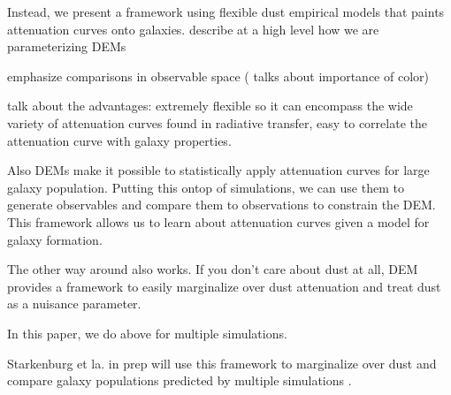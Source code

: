 Instead, we present a framework using flexible dust empirical models that
paints attenuation curves onto galaxies. describe at a high level how we are
parameterizing DEMs 

emphasize comparisons in observable space (\cite{nelson2018} talks about
importance of color)

talk about the advantages: extremely flexible so it can encompass the wide variety of
attenuation curves found in radiative transfer, easy to correlate the
attenuation curve with galaxy properties. 

Also DEMs make it possible to statistically apply attenuation curves for large
galaxy population. Putting this ontop of simulations, we can use them to
generate observables and compare them to observations to constrain the DEM. 
This framework allows us to learn about attenuation curves given a model for 
galaxy formation. 

The other way around also works. If you don't care about dust at all, DEM
provides a framework to easily marginalize over dust attenuation and treat dust
as a nuisance parameter. 

In this paper, we do above for multiple simulations. 

Starkenburg et la. in prep will use this framework to marginalize over dust and compare galaxy populations predicted by multiple
simulations . 


